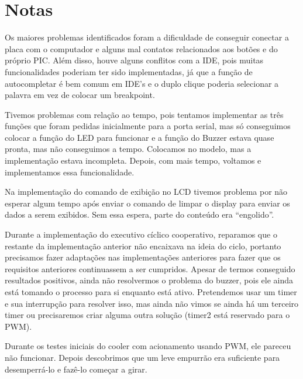 \documentclass{article}
\begin{document}
\section{Notas}
Os maiores problemas identificados foram a dificuldade de conseguir conectar a placa com o computador e alguns mal contatos relacionados aos botões e do próprio PIC. Além disso, houve alguns conflitos com a IDE, pois muitas funcionalidades poderiam ter sido implementadas, já que a função de autocompletar é bem comum em IDE's e o duplo clique poderia selecionar a palavra em vez de colocar um breakpoint.

Tivemos problemas com relação ao tempo, pois tentamos implementar as três funções que foram pedidas inicialmente para a porta serial, mas só conseguimos colocar a função do LED para funcionar e a função do Buzzer estava quase pronta, mas não conseguimos a tempo. Colocamos no modelo, mas a implementação estava incompleta. Depois, com mais tempo, voltamos e implementamos essa funcionalidade.

Na implementação do comando de exibição no LCD tivemos problema por não esperar algum tempo após enviar o comando de limpar o display para enviar os dados a serem exibidos. Sem essa espera, parte do conteúdo era ``engolido''.

Durante a implementação do executivo cíclico cooperativo, reparamos que o restante da implementação anterior não encaixava na ideia do ciclo, portanto precisamos fazer adaptações nas implementações anteriores para fazer que os requisitos anteriores continuassem a ser cumpridos. Apesar de termos conseguido resultados positivos, ainda não resolvermos o problema do buzzer, pois ele ainda está tomando o processo para si enquanto está ativo. Pretendemos usar um timer e sua interrupção para resolver isso, mas ainda não vimos se ainda há um terceiro timer ou precisaremos criar alguma outra solução (timer2 está reservado para o PWM).

Durante os testes iniciais do cooler com acionamento usando PWM, ele pareceu não funcionar. Depois descobrimos que um leve empurrão era suficiente para desemperrá-lo e fazê-lo começar a girar.

\begin{thebibliography}{widestlabel}

\end{thebibliography}
\end{document}
